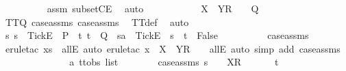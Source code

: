 \begin{isabellebody}
\ \ \ \ \ \ \ \ \isamarkupfalse%
\ assm{}\ subsetCE\ \isamarkupfalse%
\ auto\isanewline
\ \ \ \ \ \ \isamarkupfalse%
\ \isamarkupfalse%
\ {\isachardoublequoteopen}{\isasymrho}{}\ {\isacharat}\ {\isacharbrackleft}X\ {\isasymunion}\ Y{\isacharbrackright}\isactrlsub R\ {\isacharhash}\ {\isasymsigma}\ {\isasymin}\ Q{\isachardoublequoteclose}\isanewline
\ \ \ \ \ \ \ \ \isamarkupfalse%
\ TT{}{\isacharunderscore}Q\ case{\isacharunderscore}assms{\isacharparenleft}{}{\isacharparenright}\ case{\isacharunderscore}assms{}{\isacharparenleft}{}{\isacharparenright}\ \isamarkupfalse%
\ TT{}{\isacharunderscore}def\ \isamarkupfalse%
\ auto\isanewline
\ \ \ \ \ \ \isamarkupfalse%
\ \isamarkupfalse%
\ {\isachardoublequoteopen}{\isasymforall}s{\isachardot}\ s\ {\isacharat}\ {\isacharbrackleft}{\isacharbrackleft}Tick{\isacharbrackright}\isactrlsub E{\isacharbrackright}\ {\isasymin}\ P\ {\isasymlongrightarrow}\ {\isacharparenleft}{\isasymforall}t{\isachardot}\ t\ {\isasymin}\ Q\ {\isasymlongrightarrow}\ sa\ {\isacharat}\ {\isacharbrackleft}{\isacharbrackleft}Tick{\isacharbrackright}\isactrlsub E{\isacharbrackright}\ {\isasymnoteq}\ s\ {\isacharat}\ t{\isacharparenright}\ {\isasymLongrightarrow}\ False{\isachardoublequoteclose}\isanewline
\ \ \ \ \ \ \ \ \isamarkupfalse%
\ case{\isacharunderscore}assms\ \isamarkupfalse%
\ {\isacharparenleft}erule{\isacharunderscore}tac\ x{\isacharequal}{\isachardoublequoteopen}s{\isachardoublequoteclose}\ \ allE{\isacharcomma}\ auto{\isacharcomma}\ erule{\isacharunderscore}tac\ x{\isacharequal}{\isachardoublequoteopen}{\isasymrho}{}\ {\isacharat}\ {\isacharbrackleft}X\ {\isasymunion}\ Y{\isacharbrackright}\isactrlsub R\ {\isacharhash}\ {\isasymsigma}{\isachardoublequoteclose}\ \ allE{\isacharcomma}\ auto\ simp\ add{\isacharcolon}\ case{\isacharunderscore}assms{}{\isacharparenright}\isanewline
\ \ \ \ \isamarkupfalse%
\isanewline
\ \ \ \ \ \ \isamarkupfalse%
\ {\isasymsigma}{}\ {\isacharcolon}{\isacharcolon}\ {\isachardoublequoteopen}{\isacharprime}a\ ttobs\ list{\isachardoublequoteclose}\isanewline
\ \ \ \ \ \ \isamarkupfalse%
\ case{\isacharunderscore}assms{}{\isacharcolon}\ {\isachardoublequoteopen}s\ {\isacharequal}\ {\isasymrho}\ {\isacharat}\ {\isacharbrackleft}X{\isacharbrackright}\isactrlsub R\ {\isacharhash}\ {\isasymsigma}{}{\isachardoublequoteclose}\ {\isachardoublequoteopen}{\isasymsigma}\ {\isacharequal}\ {\isasymsigma}{}\ {\isacharat}\ t{\isachardoublequoteclose}\isanewline

\end{isabellebody}
